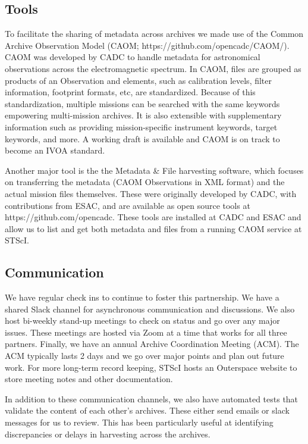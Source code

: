 \documentclass[11pt,twoside]{article}
\begin{document}
\subsection{Tools}

To facilitate the sharing of metadata across archives we made use of the Common Archive Observation Model (CAOM; https://github.com/opencadc/CAOM/). 
CAOM was developed by CADC to handle metadata for astronomical observations across the electromagnetic spectrum. 
In CAOM, files are grouped as products of an Observation and elements, such as calibration levels, filter information, footprint formats, etc, are standardized. 
Because of this standardization, multiple missions can be searched with the same keywords empowering multi-mission archives. 
It is also extensible with supplementary information such as providing mission-specific instrument keywords, target keywords, and more. 
A working draft is available and CAOM is on track to become an IVOA standard. 

Another major tool is the the Metadata \& File harvesting software, which focuses on 
transferring the metadata (CAOM Observations in XML format) and the actual mission files themselves. 
These were originally developed by CADC, with contributions from ESAC, 
and are available as open source tools at https://github.com/opencadc.
These tools are installed at CADC and ESAC and allow us to list and get both metadata and files from a running CAOM service at STScI. 

\subsection{Communication}

We have regular check ins to continue to foster this partnership. 
We have a shared Slack channel for asynchronous communication and discussions. 
We also host bi-weekly stand-up meetings to check on status and go over any major issues. 
These meetings are hosted via Zoom at a time that works for all three partners. 
Finally, we have an annual Archive Coordination Meeting (ACM). 
The ACM typically lasts 2 days and we go over major points and plan out future work. 
For more long-term record keeping, STScI hosts an Outerspace website to store meeting notes and other documentation.

In addition to these communication channels, we also have automated tests that validate the content of each other's archives. 
These either send emails or slack messages for us to review.
This has been particularly useful at identifying discrepancies or delays in harvesting across the archives. 
\end{document}
